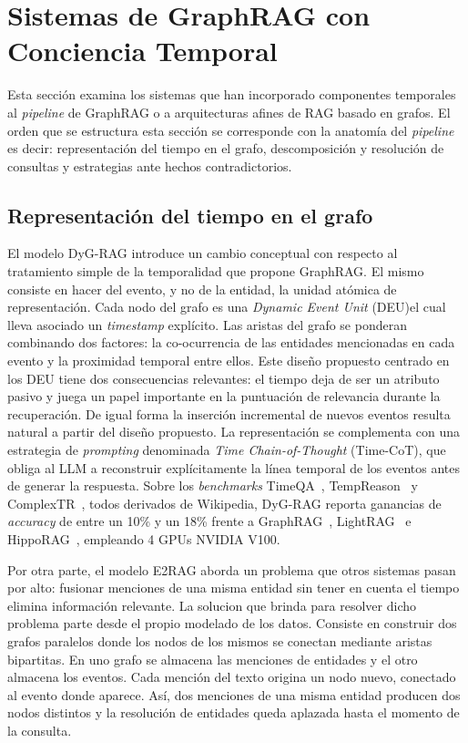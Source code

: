 \section{Sistemas de GraphRAG con Conciencia Temporal}\label{sec:temporal-graphrag}

Esta sección examina los sistemas que han incorporado componentes temporales al \emph{pipeline} de GraphRAG o a arquitecturas afines de RAG basado en grafos. El orden que se estructura esta sección se corresponde con la anatomía del \emph{pipeline} es decir: representación del tiempo en el grafo, descomposición y resolución de consultas y estrategias ante hechos contradictorios.

\subsection{Representación del tiempo en el grafo}

El modelo DyG-RAG \cite{dyg_rag2025} introduce un cambio conceptual con respecto al tratamiento simple de la temporalidad que propone GraphRAG. El mismo consiste en hacer del evento, y no de la entidad, la unidad atómica de representación. Cada nodo del grafo es una \emph{Dynamic Event Unit} (DEU)\cite{dyg_rag2025}el cual lleva asociado un \emph{timestamp} explícito. Las aristas del grafo se ponderan combinando dos factores: la co-ocurrencia de las entidades mencionadas en cada evento y la proximidad temporal entre ellos. Este diseño propuesto centrado en los DEU tiene dos consecuencias relevantes: el tiempo deja de ser un atributo pasivo y juega un papel importante en la puntuación de relevancia durante la recuperación. De igual forma la inserción incremental de nuevos eventos resulta natural a partir del diseño propuesto. La representación se complementa con una estrategia de \emph{prompting} denominada \emph{Time Chain-of-Thought} (Time-CoT)\cite{dyg_rag2025}, que obliga al LLM a reconstruir explícitamente la línea temporal de los eventos antes de generar la respuesta. Sobre los \emph{benchmarks} TimeQA~\cite{timeqa_placeholder}, TempReason~\cite{tempreason_placeholder} y ComplexTR~\cite{complextr_placeholder}, todos derivados de Wikipedia, DyG-RAG reporta ganancias de \emph{accuracy} de entre un 10\% y un 18\% frente a GraphRAG~\cite{graphrag_placeholder}, LightRAG~\cite{lightrag_placeholder} e HippoRAG~\cite{hipporag_placeholder}, empleando 4 GPUs NVIDIA V100.

Por otra parte, el modelo E2RAG aborda un problema que otros sistemas pasan por alto: fusionar menciones de una misma entidad sin tener en cuenta el tiempo elimina información relevante.  La solucion que brinda para resolver dicho problema parte desde el propio modelado de los datos. Consiste en construir dos grafos paralelos donde los nodos de los mismos se conectan mediante aristas bipartitas. En uno grafo se almacena las menciones de entidades y el otro almacena los eventos. Cada mención del texto origina un nodo nuevo, conectado al evento donde aparece. Así, dos menciones de una misma entidad producen dos nodos distintos y la resolución de entidades queda aplazada hasta el momento de la consulta.

